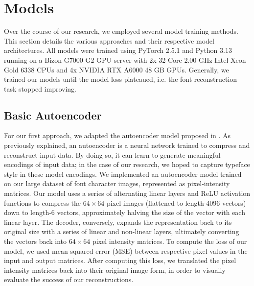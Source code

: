 \section{Models}

Over the course of our research, we employed several model training methods. This section details the various approaches and their respective model architectures. All models were trained using PyTorch 2.5.1 and Python 3.13 running on a Bizon G7000 G2 GPU server with 2x 32-Core 2.00 GHz Intel Xeon Gold 6338 CPUs and 4x NVIDIA RTX A6000 48 GB GPUs. Generally, we trained our models until the model loss plateaued, i.e. the font reconstruction task stopped improving.

\subsection{Basic Autoencoder} \label{basic-autoencoder-2}

For our first approach, we adapted the autoencoder model proposed in \cite{rumelhart1986}. As previously explained, an autoencoder is a neural network trained to compress and reconstruct input data. By doing so, it can learn to generate meaningful encodings of input data; in the case of our research, we hoped to capture typeface style in these model encodings. We implemented an autoencoder model trained on our large dataset of font character images, represented as pixel-intensity matrices. Our model uses a series of alternating linear layers and ReLU activation functions to compress the $64 \times 64$ pixel images (flattened to length-4096 vectors) down to length-6 vectors, approximately halving the size of the vector with each linear layer. The decoder, conversely, expands the representation back to its original size with a series of linear and non-linear layers, ultimately converting the vectors back into $64 \times 64$ pixel intensity matrices. To compute the loss of our model, we used mean squared error (MSE) between respective pixel values in the input and output matrices. After computing this loss, we translated the pixel intensity matrices back into their original image form, in order to visually evaluate the success of our reconstructions.

